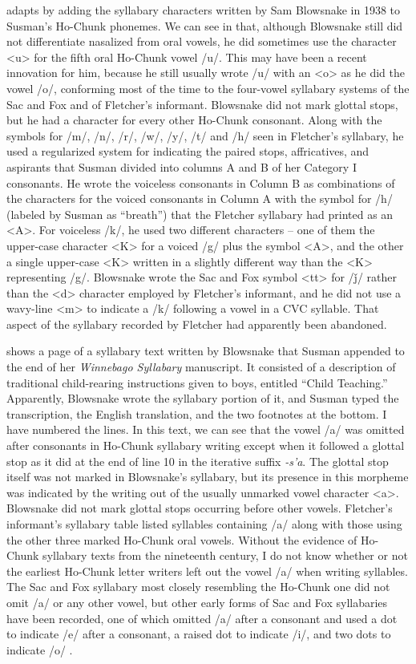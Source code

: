 \documentclass[output=paper]{LSP/langsci}
\begin{document}
 adapts  by adding the syllabary characters written by Sam Blowsnake in 1938 to Susman's Ho-Chunk phonemes. We can see in  that, although Blowsnake still did not differentiate nasalized from oral vowels, he did sometimes use the character <u> for the fifth oral Ho-Chunk vowel /u/. This may have been a recent innovation for him, because he still usually wrote /u/ with an <o> as he did the vowel /o/, conforming most of the time to the four-vowel syllabary systems of the Sac and Fox and of Fletcher's informant. Blowsnake did not mark glottal stops, but he had a character for every other Ho-Chunk consonant. Along with the symbols for /m/, /n/, /r/, /w/, /y/, /t/ and /h/ seen in Fletcher's syllabary, he used a regularized system for indicating the paired stops, affricatives, and aspirants that Susman divided into columns A and B of her Category I consonants. He wrote the voiceless consonants in Column B as combinations of the characters for the voiced consonants in Column A with the symbol for /h/ (labeled by Susman as ``breath'') that the Fletcher syllabary had printed as an <A>. For voiceless /k/, he used two different characters -- one of them the upper-case character <K> for a voiced /g/ plus the symbol <A>, and the other a single upper-case <K> written in a slightly different way than the <K> representing /g/. Blowsnake wrote the Sac and Fox symbol <tt> for /\v{j}/ rather than the <d> character employed by Fletcher's informant, and he did not use a wavy-line <m> to indicate a /k/ following a vowel in a CVC syllable. That aspect of the syllabary recorded by Fletcher had apparently been abandoned.

 shows a page of a syllabary text written by Blowsnake that Susman appended to the end of her \emph{Winnebago Syllabary} manuscript. It consisted of a description of traditional child-rearing instructions given to boys, entitled ``Child Teaching.'' Apparently, Blowsnake wrote the syllabary portion of it, and Susman typed the transcription, the English translation, and the two footnotes at the bottom. I have numbered the lines. In this text, we can see that the vowel /a/ was omitted after consonants in Ho-Chunk syllabary writing except when it followed a glottal stop as it did at the end of line 10 in the iterative suffix \emph{-s'a}. The glottal stop itself was not marked in Blowsnake's syllabary, but its presence in this morpheme was indicated by the writing out of the usually unmarked vowel character <a>. Blowsnake did not mark glottal stops occurring before other vowels. Fletcher's informant's syllabary table listed syllables containing /a/ along with those using the other three marked Ho-Chunk oral vowels. Without the evidence of Ho-Chunk syllabary texts from the nineteenth century, I do not know whether or not the earliest Ho-Chunk letter writers left out the vowel /a/ when writing syllables. The Sac and Fox syllabary most closely resembling the Ho-Chunk one did not omit /a/ or any other vowel, but other early forms of Sac and Fox syllabaries have been recorded, one of which omitted /a/ after a consonant and used a dot to indicate /e/ after a consonant, a raised dot to indicate /i/, and two dots to indicate /o/ \citep[158--159]{Walker1981}.
\end{document}
